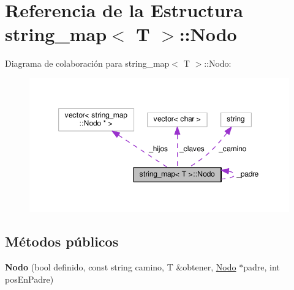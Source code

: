 \hypertarget{structstring__map_1_1Nodo}{\section{Referencia de la Estructura string\-\_\-map$<$ T $>$\-:\-:Nodo}
\label{structstring__map_1_1Nodo}
}


Diagrama de colaboración para string\-\_\-map$<$ T $>$\-:\-:Nodo\-:
\nopagebreak
\begin{figure}[H]
\begin{center}
\leavevmode
\includegraphics[width=349pt]{structstring__map_1_1Nodo__coll__graph}
\end{center}
\end{figure}
\subsection*{Métodos públicos}
\begin{DoxyCompactItemize}
\item 
\hypertarget{structstring__map_1_1Nodo_a8ac594cdba5810ff914ffc4efc63550e}{{\bfseries Nodo} (bool definido, const string camino, T \&obtener, \hyperlink{structstring__map_1_1Nodo}{Nodo} $\ast$padre, int pos\-En\-Padre)}\label{structstring__map_1_1Nodo_a8ac594cdba5810ff914ffc4efc63550e}

\end{DoxyCompactItemize}
